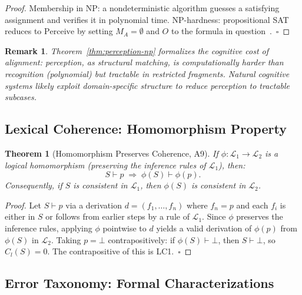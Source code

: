 \documentclass{article}
\newcommand{\MA}{M_A}
\newtheorem{theorem}{Theorem}
\newtheorem{remark}{Remark}
\begin{document}
\begin{proof}
Membership in NP: a nondeterministic algorithm guesses a satisfying assignment
and verifies it in polynomial time.  NP-hardness: propositional SAT reduces to
$\mathrm{Perceive}$ by setting $\MA = \emptyset$ and $O$ to the formula in
question~\cite{cook1971}.~$\square$
\end{proof}

\begin{remark}
Theorem~\ref{thm:perception-np} formalizes the cognitive cost of alignment:
perception, as structural matching, is computationally harder than recognition
(polynomial) but tractable in restricted fragments.  Natural cognitive systems
likely exploit domain-specific structure to reduce perception to tractable
subcases.
\end{remark}

\subsection{Lexical Coherence: Homomorphism Property}
\label{app:lexical-proofs}

\begin{theorem}[Homomorphism Preserves Coherence, A9]
\label{thm:hom-coherence}
If $\phi : \mathcal{L}_1 \to \mathcal{L}_2$ is a logical homomorphism
(preserving the inference rules of $\mathcal{L}_1$), then:
\[
  S \vdash p \;\Rightarrow\; \phi(S) \vdash \phi(p).
\]
Consequently, if $S$ is consistent in $\mathcal{L}_1$, then $\phi(S)$ is
consistent in $\mathcal{L}_2$.
\end{theorem}

\begin{proof}
Let $S \vdash p$ via a derivation $d = (f_1, \ldots, f_n)$ where $f_n = p$ and
each $f_i$ is either in $S$ or follows from earlier steps by a rule of
$\mathcal{L}_1$.  Since $\phi$ preserves the inference rules, applying $\phi$
pointwise to $d$ yields a valid derivation of $\phi(p)$ from $\phi(S)$ in
$\mathcal{L}_2$.  Taking $p = \bot$ contrapositively: if $\phi(S) \vdash \bot$,
then $S \vdash \bot$, so $C_l(S) = 0$.  The contrapositive of this is LC1.~$\square$
\end{proof}

\subsection{Error Taxonomy: Formal Characterizations}
\label{app:error-proofs}
\end{document}
